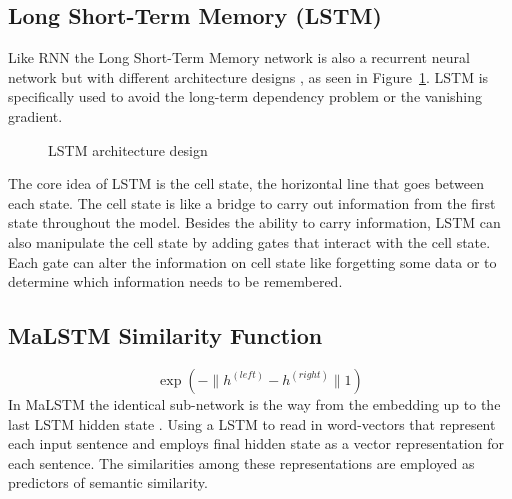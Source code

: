 \documentclass[12pt,oneside,openright,a4paper]{cpe-english-project}
\begin{document}
\subsection{Long Short-Term Memory (LSTM)}
Like RNN the Long Short-Term Memory network is also a recurrent neural network but with
different architecture designs \cite{understand_rnn}, as seen in Figure~\ref*{fig:lstm_arch_design}.
LSTM is specifically used to avoid the long-term dependency problem or the vanishing gradient.

\begin{figure}[!h] \centering
  \setlength{\fboxrule}{0.2mm}
  \setlength{\fboxsep}{0.5cm}
  \caption{LSTM architecture design}
  \label{fig:lstm_arch_design}
\end{figure}

The core idea of LSTM is the cell state, the horizontal line that goes between each state. The
cell state is like a bridge to carry out information from the first state throughout the model.
Besides the ability to carry information, LSTM can also manipulate the cell state by adding gates
that interact with the cell state. Each gate can alter the information on cell state like
forgetting some data or to determine which information needs to be remembered. 

\subsection{MaLSTM Similarity Function}
\[\exp(-\|h^{(left)} - h^{(right)}\|1)\]
In MaLSTM the identical sub-network is the way from the embedding up to the last LSTM hidden
state \cite{manhattan_lstm, what_is_embedding_matrix}. Using a LSTM to read in word-vectors that represent each
input sentence and employs final hidden state as a vector representation for each sentence.
The similarities among these representations are employed as predictors of semantic similarity.
\end{document}
